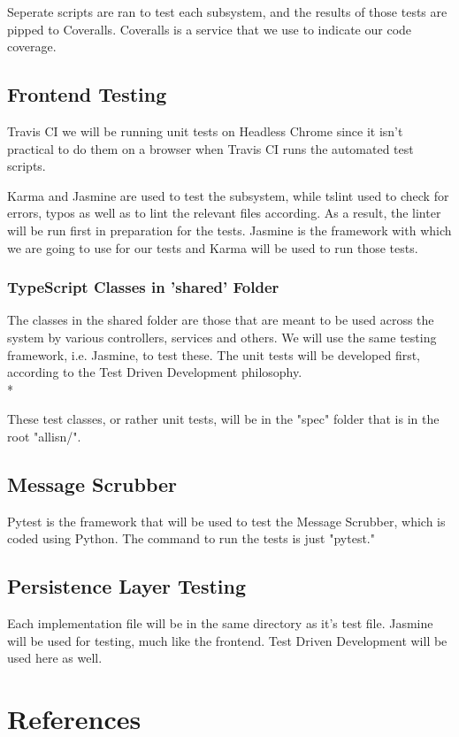 \documentclass[11pt]{article}
\begin{document}
Seperate scripts are ran to test each subsystem, and the results of those tests are pipped to Coveralls. Coveralls is a service that we use to indicate our code coverage.

\subsection{Frontend Testing}

Travis CI we will be running unit tests on Headless Chrome\cite{Website:3} since it isn't practical to do them on a browser when Travis CI runs the automated test scripts.\par
Karma and Jasmine are used to test the subsystem, while tslint used to check for errors, typos as well as to lint the relevant files according. As a result, the linter will be run first in preparation for the tests. Jasmine is the framework with which we are going to use for our tests and Karma will be used to run those tests.

\subsubsection{TypeScript Classes in 'shared' Folder}

The classes in the shared folder are those that are meant to be used across the system by various controllers, services and others. We will use the same testing framework, i.e. Jasmine, to test these. The unit tests will be developed first, according to the Test Driven Development philosophy.\\*

These test classes, or rather unit tests, will be in the "spec" folder that is in the root "allisn/".

\subsection{Message Scrubber}

Pytest is the framework that will be used to test the Message Scrubber, which is coded using Python. The command to run the tests is just "pytest."

\subsection{Persistence Layer Testing}

Each implementation file will be in the same directory as it's test file. Jasmine will be used for testing, much like the frontend. Test Driven Development will be used here as well.

\section{References}


\end{document}
